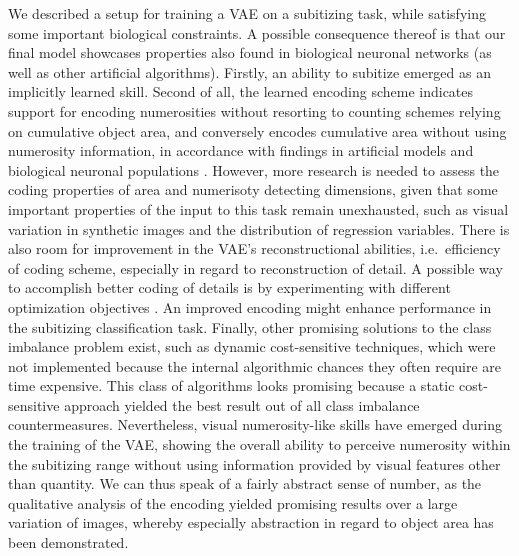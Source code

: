 \documentclass[twocolumn]{article}
\begin{document}
We described a setup for training a VAE on a subitizing task, while
satisfying some important biological constraints. A possible consequence
thereof is that our final model showcases properties also found in
biological neuronal networks (as well as other artificial algorithms).
Firstly, an ability to subitize emerged as an implicitly learned skill.
Second of all, the learned encoding scheme indicates support for
encoding numerosities without resorting to counting schemes relying on
cumulative object area, and conversely encodes cumulative area
without using numerosity information, in accordance with findings in artificial models \citep{stoianov2012} and biological neuronal populations \citep{harvey2013topographic, nieder2016neuronal}. However,
more research is needed to assess the coding properties of area and numerisoty detecting dimensions, given that some important properties of the input to this task remain unexhausted, such as visual variation in synthetic images and the distribution of regression variables.
There is also room for improvement in the VAE's reconstructional abilities,
i.e.~efficiency of coding scheme, especially in regard to reconstruction of detail. A possible way to accomplish better coding of details is by experimenting with different optimization objectives \citep[e.g.][]{dosovitskiy2016generating}. An improved encoding might enhance performance in the subitizing classification task. Finally, other promising solutions to the class imbalance problem exist, such as dynamic cost-sensitive techniques, which were not implemented because the internal algorithmic chances they often require are time expensive. This class of algorithms looks promising because a static cost-sensitive approach yielded the best result out of all class imbalance countermeasures. 
Nevertheless, visual numerosity-like skills have emerged during the
training of the VAE, showing the overall ability to perceive numerosity
within the subitizing range without using information provided by visual
features other than quantity. We can thus speak of a fairly abstract
sense of number, as the qualitative analysis of the encoding yielded
promising results over a large variation of images, whereby especially
abstraction in regard to object area has been demonstrated.


\end{document}
